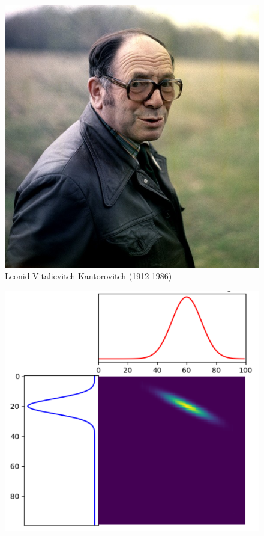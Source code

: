 \documentclass{beamer}
\theoremstyle{definition}
\begin{document}
\begin{frame}
	
	\frametitle{}
	\begin{minipage}[t]{1\linewidth}
	\begin{minipage}{0.4\linewidth}\centering\begin{figure}
			\centering
			\includegraphics[scale=0.25]{Kantorovich.png}
			\caption*{ Leonid Vitalievitch Kantorovitch (1912-1986)}
	\end{figure}\end{minipage}\hfil
	\begin{minipage}{0.43\linewidth}\centering\begin{figure}
			\includegraphics[scale=0.3]{couplage.png}			

\end{figure}
\end{minipage}
\end{minipage}
\end{frame}
\end{document}
